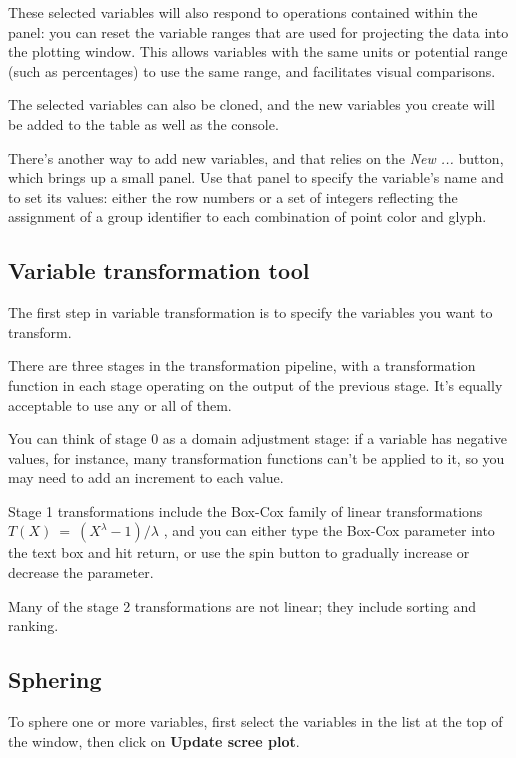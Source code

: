\documentclass[11pt]{article}
\begin{document}
These selected variables will also respond to operations contained
within the panel:  you can reset the variable ranges that are used
for projecting the data into the plotting window.  This allows
variables with the same units or potential range (such as percentages)
to use the same range, and facilitates visual comparisons.

The selected variables can also be cloned, and the new variables
you create will be added to the table as well as the console.

\label{NewVariable}
There's another way to add new variables, and that relies on the {\em New
...} button, which brings up a small panel.  Use that panel to specify
the variable's name and to set its values:  either the row numbers or
a set of integers reflecting the assignment of a group identifier to each
combination of point color and glyph.

\subsection{Variable transformation tool}
\label{slbl:VarTransform}

The first step in variable transformation is to specify the variables
you want to transform.

There are three stages in the transformation pipeline, with a
transformation function in each stage operating on the output of the
previous stage.  It's equally acceptable to use any or all of them.

You can think of stage 0 as a domain adjustment stage:  if a variable
has negative values, for instance, many transformation functions
can't be applied to it, so you may need to add an increment to each
value.

Stage 1 transformations include the Box-Cox family of linear
transformations \( T(X)~=~(X ^ \lambda - 1) / \lambda\) \cite{BoxCox64},
and you can either type the Box-Cox parameter into
the text box and hit return, or use the spin button to gradually
increase or decrease the parameter. 

Many of the stage 2
transformations are not linear; they include sorting and ranking.

\subsection{Sphering}
\label{slbl:Sphering}

To sphere one or more variables, first select the variables in the list
at the top of the window, then click on {\bf Update scree plot}.
\end{document}
